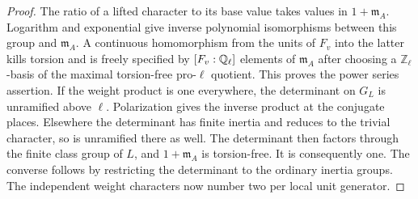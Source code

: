 \documentclass[a4paper,11pt]{article}
\theoremstyle{definition}
\theoremstyle{remark}
\newcommand{\ZZ}{\mathbb Z}\newcommand{\ord}{\operatorname{ord}}
\numberwithin{equation}{section}
\begin{document}
\begin{proof}
The ratio of a lifted character to its base value takes values
in \(1+\mathfrak m_A\). Logarithm and exponential give inverse
polynomial isomorphisms between this group and
\(\mathfrak m_A\). A continuous homomorphism from the units
of \(F_v\) into the latter kills torsion and is freely
specified by \([F_v:\mathbb Q_\ell]\) elements of \(\mathfrak m_A\)
after choosing a \(\ZZ_\ell\)-basis of the maximal torsion-free
pro-\(\ell\) quotient. This proves the power series assertion.
If the weight product is one everywhere, the determinant on
\(G_L\) is unramified above \(\ell\). Polarization gives the
inverse product at the conjugate places. Elsewhere the
determinant has finite inertia and reduces to the trivial
character, so is unramified there as well. The determinant
then factors through the finite class group of \(L\), and
\(1+\mathfrak m_A\) is torsion-free. It is consequently one.
The converse follows by restricting the determinant to the
ordinary inertia groups. The independent weight characters
now number two per local unit generator.
\end{proof}
\end{document}
